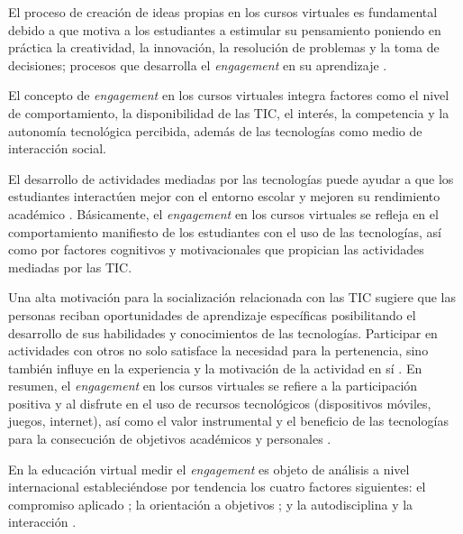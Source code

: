 \documentclass[spanish]{textolivre}
\begin{document}
El proceso de creación de ideas propias en los cursos virtuales es fundamental debido a que motiva a los estudiantes a estimular su pensamiento poniendo en práctica la creatividad, la innovación, la resolución de problemas y la toma de decisiones; procesos que desarrolla el \emph{engagement} en su aprendizaje \cite{barrios2014}. %

El concepto de \emph{engagement} en los cursos virtuales integra factores como el nivel de comportamiento, la disponibilidad de las TIC, el interés, la competencia y la autonomía tecnológica percibida, además de las tecnologías como medio de interacción social.

El desarrollo de actividades mediadas por las tecnologías puede ayudar a que los estudiantes interactúen mejor con el entorno escolar y mejoren su rendimiento académico \cite{goldhammer2017}. %
Básicamente, el \emph{engagement} en los cursos virtuales se refleja en el comportamiento manifiesto de los estudiantes con el uso de las tecnologías, así como por factores cognitivos y motivacionales que propician las actividades mediadas por las TIC.

Una alta motivación para la socialización relacionada con las TIC sugiere que las personas reciban oportunidades de aprendizaje específicas posibilitando el desarrollo de sus habilidades y conocimientos de las tecnologías. Participar en actividades con otros no solo satisface la necesidad para la pertenencia, sino también influye en la experiencia y la motivación de la actividad en sí \cite{senkbeil2018}. %
En resumen, el \emph{engagement} en los cursos virtuales se refiere a la participación positiva y al disfrute en el uso de recursos tecnológicos (dispositivos móviles, juegos, internet), así como el valor instrumental y el beneficio de las tecnologías para la consecución de objetivos académicos y personales \cite{goldhammer2017}. %

En la educación virtual medir el \emph{engagement} \cite{mohd2020} %
es objeto de análisis a nivel internacional estableciéndose por tendencia los cuatro factores siguientes:  el compromiso aplicado \cite{handelsman2005, shumow2013}; %
la orientación a objetivos \cite{bakker2018, mohd2020, eltahir2021}; %
y la autodisciplina y la interacción \cite{alexander2018, kerimbayev2020, snyder2020, sim2021, walker2021, smith2021}. %
\end{document}
